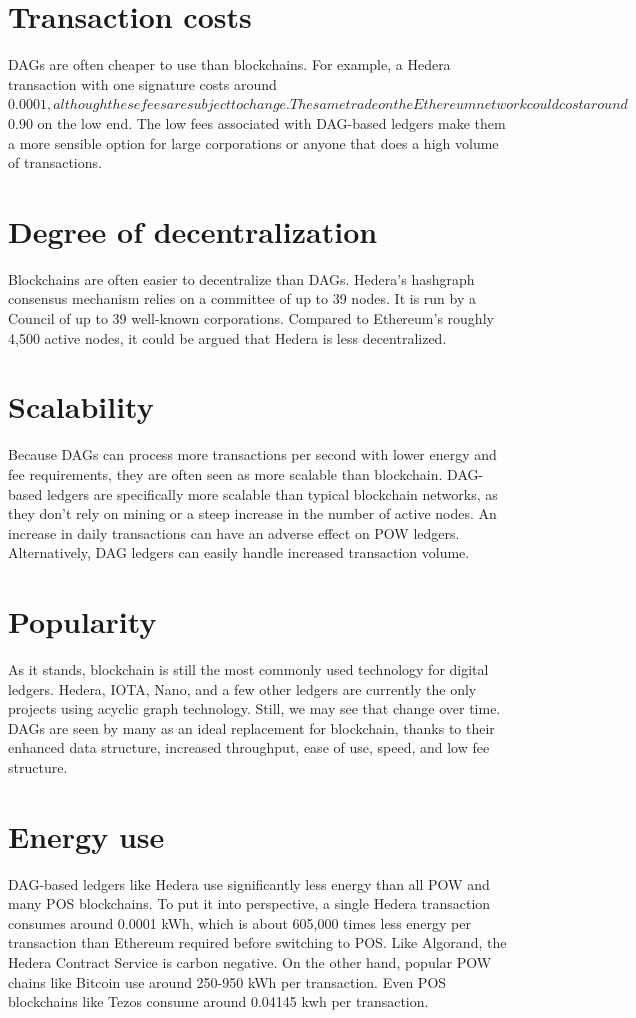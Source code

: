 \documentclass{article}
\begin{document}
\section{Transaction costs}
DAGs are often cheaper to use than blockchains. For example, a Hedera transaction with one signature costs around $0.0001, although these fees are subject to change. The same trade on the Ethereum network could cost around $0.90 on the low end. The low fees associated with DAG-based ledgers make them a more sensible option for large corporations or anyone that does a high volume of transactions.

\section{Degree of decentralization}
Blockchains are often easier to decentralize than DAGs. Hedera’s hashgraph consensus mechanism relies on a committee of up to 39 nodes. It is run by a Council of up to 39 well-known corporations. Compared to Ethereum’s roughly 4,500 active nodes, it could be argued that Hedera is less decentralized.

\section{Scalability}
Because DAGs can process more transactions per second with lower energy and fee requirements, they are often seen as more scalable than blockchain. DAG-based ledgers are specifically more scalable than typical blockchain networks, as they don’t rely on mining or a steep increase in the number of active nodes. An increase in daily transactions can have an adverse effect on POW ledgers. Alternatively, DAG ledgers can easily handle increased transaction volume.

\section{Popularity}
As it stands, blockchain is still the most commonly used technology for digital ledgers. Hedera, IOTA, Nano, and a few other ledgers are currently the only projects using acyclic graph technology. Still, we may see that change over time. DAGs are seen by many as an ideal replacement for blockchain, thanks to their enhanced data structure, increased throughput, ease of use, speed, and low fee structure.

\section{Energy use}
DAG-based ledgers like Hedera use significantly less energy than all POW and many POS blockchains. To put it into perspective, a single Hedera transaction consumes around 0.0001 kWh, which is about 605,000 times less energy per transaction than Ethereum required before switching to POS. Like Algorand, the Hedera Contract Service is carbon negative. On the other hand, popular POW chains like Bitcoin use around 250-950 kWh per transaction. Even POS blockchains like Tezos consume around 0.04145 kwh per transaction.
\end{document}
